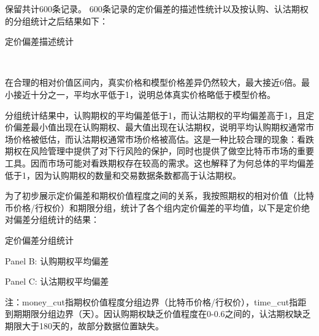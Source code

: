 \par{保留共计600条记录。
600条记录的定价偏差的描述性统计以及按认购、认沽期权的分组统计之后结果如下：}
~\\
\begin{center}
    \begin{threeparttable}[H]
    
        \begin{small}
            \caption{定价偏差描述统计}
            \label{tab:option_bias_group}
                
                
        \end{small} 
    \end{threeparttable}
\end{center}
~\\
\par{在合理的相对价值区间内，真实价格和模型价格差异仍然较大，最大接近6倍。最小接近十分之一，平均水平低于1，说明总体真实价格略低于模型价格。}
\par{分组统计结果中，认购期权的平均偏差低于1，而认沽期权的平均偏差高于1，且定价偏差最小值出现在认购期权、最大值出现在认沽期权，说明平均认购期权通常市场价格被低估，而认沽期权通常市场价格被高估。这是一种比较合理的现象：看跌期权在风险管理中提供了对下行风险的保护，同时也提供了做空比特币市场的重要工具。因而市场可能对看跌期权存在较高的需求。这也解释了为何总体的平均偏差低于1，因为认购期权的数量和交易数据条数都高于认沽期权。}
~\\
\par{为了初步展示定价偏差和期权价值程度之间的关系，我按照期权的相对价值（比特币价格/行权价）和期限分组，统计了各个组内定价偏差的平均值，以下是定价绝对偏差分组统计的结果：}
~\\
\begin{center}
\begin{threeparttable}[HT]
\centering
\caption{定价偏差分组统计}
\label{tab:option_bias_group}
\begin{small}


\bigskip

\caption*{Panel B: 认购期权平均偏差}
\bigskip

\caption*{Panel C: 认沽期权平均偏差}
\begin{tablenotes}
    \footnotesize
    \item 注：money\_cut指期权价值程度分组边界（比特币价格/行权价），time\_cut指距到期期限分组边界（天）。因认购期权缺乏价值程度在0-0.6之间的，认沽期权缺乏期限大于180天的，故部分数据位置缺失。
\end{tablenotes}
        \end{small}
    \end{threeparttable}
        
\end{center}
